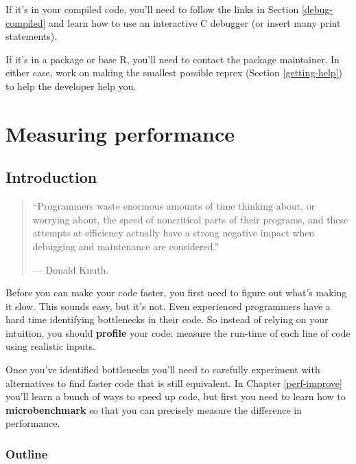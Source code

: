 \documentclass[]{book}
\begin{document}
\begin{itemize}
  If it's in your compiled code, you'll need to follow the links in Section
  \ref{debug-compiled} and learn how to use an interactive C debugger
  (or insert many print statements).

  If it's in a package or base R, you'll need to contact the package
  maintainer. In either case, work on making the smallest possible
  reprex (Section \ref{getting-help}) to help the developer help you.
\end{itemize}

\hypertarget{perf-measure}{%
\chapter{Measuring performance}\label{perf-measure}}


\hypertarget{introduction-8}{%
\section{Introduction}\label{introduction-8}}

\begin{quote}
``Programmers waste enormous amounts of time thinking about, or worrying
about, the speed of noncritical parts of their programs, and these attempts
at efficiency actually have a strong negative impact when debugging and
maintenance are considered.''

\hspace*{\fill} --- Donald Knuth.
\end{quote}

Before you can make your code faster, you first need to figure out what's making it slow. This sounds easy, but it's not. Even experienced programmers have a hard time identifying bottlenecks in their code. So instead of relying on your intuition, you should \textbf{profile} your code: measure the run-time of each line of code using realistic inputs.

Once you've identified bottlenecks you'll need to carefully experiment with alternatives to find faster code that is still equivalent. In Chapter \ref{perf-improve} you'll learn a bunch of ways to speed up code, but first you need to learn how to \textbf{microbenchmark} so that you can precisely measure the difference in performance.

\hypertarget{outline-6}{%
\subsection*{Outline}\label{outline-6}}
\end{document}

